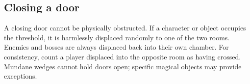 \subsection{Closing a door}

A closing door cannot be physically obstructed. If a character or object occupies the threshold, it is harmlessly displaced randomly to one of the two rooms. Enemies and bosses are always displaced back into their own chamber. For consistency, count a player displaced into the opposite room as having crossed. Mundane wedges cannot hold doors open; specific magical objects may provide exceptions.
